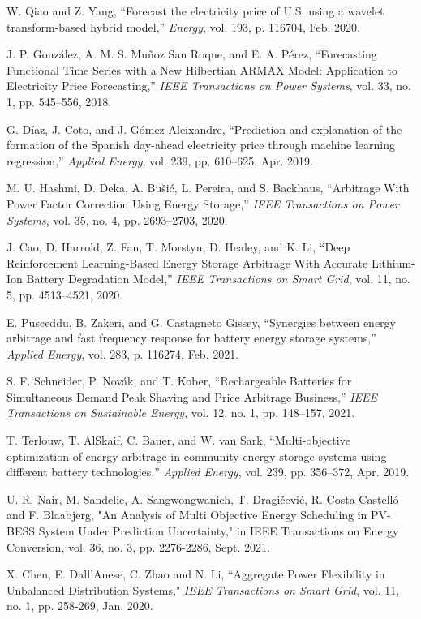 \documentclass[journal]{IEEEtran}
\begin{document}
\begin{thebibliography}{2}
W. Qiao and Z. Yang, “Forecast the electricity price of U.S. using a wavelet transform-based hybrid model,” \emph{Energy}, vol. 193, p. 116704, Feb. 2020.

J. P. González, A. M. S. Muñoz San Roque, and E. A. Pérez, “Forecasting Functional Time Series with a New Hilbertian ARMAX Model: Application to Electricity Price Forecasting,” \emph{IEEE Transactions on Power Systems}, vol. 33, no. 1, pp. 545–556, 2018.

G. Díaz, J. Coto, and J. Gómez-Aleixandre, “Prediction and explanation of the formation of the Spanish day-ahead electricity price through machine learning regression,” \emph{Applied Energy}, vol. 239, pp. 610–625, Apr. 2019.

M. U. Hashmi, D. Deka, A. Bušić, L. Pereira, and S. Backhaus, “Arbitrage With Power Factor Correction Using Energy Storage,” \emph{IEEE Transactions on Power Systems}, vol. 35, no. 4, pp. 2693–2703, 2020.

J. Cao, D. Harrold, Z. Fan, T. Morstyn, D. Healey, and K. Li, “Deep Reinforcement Learning-Based Energy Storage Arbitrage With Accurate Lithium-Ion Battery Degradation Model,” \emph{IEEE Transactions on Smart Grid}, vol. 11, no. 5, pp. 4513–4521, 2020.

E. Pusceddu, B. Zakeri, and G. Castagneto Gissey, “Synergies between energy arbitrage and fast frequency response for battery energy storage systems,” \emph{Applied Energy}, vol. 283, p. 116274, Feb. 2021.

S. F. Schneider, P. Novák, and T. Kober, “Rechargeable Batteries for Simultaneous Demand Peak Shaving and Price Arbitrage Business,” \emph{IEEE Transactions on Sustainable Energy}, vol. 12, no. 1, pp. 148–157, 2021.

T. Terlouw, T. AlSkaif, C. Bauer, and W. van Sark, “Multi-objective optimization of energy arbitrage in community energy storage systems using different battery technologies,” \emph{Applied Energy}, vol. 239, pp. 356–372, Apr. 2019.

U. R. Nair, M. Sandelic, A. Sangwongwanich, T. Dragičević, R. Costa-Castelló and F. Blaabjerg, "An Analysis of Multi Objective Energy Scheduling in PV-BESS System Under Prediction Uncertainty," in IEEE Transactions on Energy Conversion, vol. 36, no. 3, pp. 2276-2286, Sept. 2021.

X. Chen, E. Dall’Anese, C. Zhao and N. Li, “Aggregate Power Flexibility in Unbalanced Distribution Systems," \emph{IEEE Transactions on Smart Grid}, vol. 11, no. 1, pp. 258-269, Jan. 2020.


\end{thebibliography}
\end{document}
